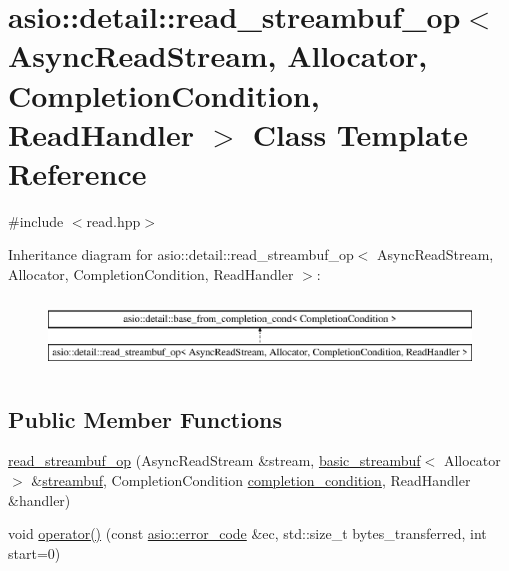\hypertarget{classasio_1_1detail_1_1read__streambuf__op}{}\section{asio\+:\+:detail\+:\+:read\+\_\+streambuf\+\_\+op$<$ Async\+Read\+Stream, Allocator, Completion\+Condition, Read\+Handler $>$ Class Template Reference}
\label{classasio_1_1detail_1_1read__streambuf__op}


{\ttfamily \#include $<$read.\+hpp$>$}

Inheritance diagram for asio\+:\+:detail\+:\+:read\+\_\+streambuf\+\_\+op$<$ Async\+Read\+Stream, Allocator, Completion\+Condition, Read\+Handler $>$\+:\begin{figure}[H]
\begin{center}
\leavevmode
\includegraphics[height=1.901528cm]{classasio_1_1detail_1_1read__streambuf__op}
\end{center}
\end{figure}
\subsection*{Public Member Functions}
\begin{DoxyCompactItemize}
\item 
\hyperlink{classasio_1_1detail_1_1read__streambuf__op_a63025076e85f597c0fe17b76a23d66c2}{read\+\_\+streambuf\+\_\+op} (Async\+Read\+Stream \&stream, \hyperlink{classasio_1_1basic__streambuf}{basic\+\_\+streambuf}$<$ Allocator $>$ \&\hyperlink{namespaceasio_a6a7ba348943527312eeace3492bf32ee}{streambuf}, Completion\+Condition \hyperlink{group__async__read_gae2e215d5013596cc2b385bb6c13fa518}{completion\+\_\+condition}, Read\+Handler \&handler)
\item 
void \hyperlink{classasio_1_1detail_1_1read__streambuf__op_acefb910e4a18a77c07795450495c07bb}{operator()} (const \hyperlink{classasio_1_1error__code}{asio\+::error\+\_\+code} \&ec, std\+::size\+\_\+t bytes\+\_\+transferred, int start=0)
\end{DoxyCompactItemize}
